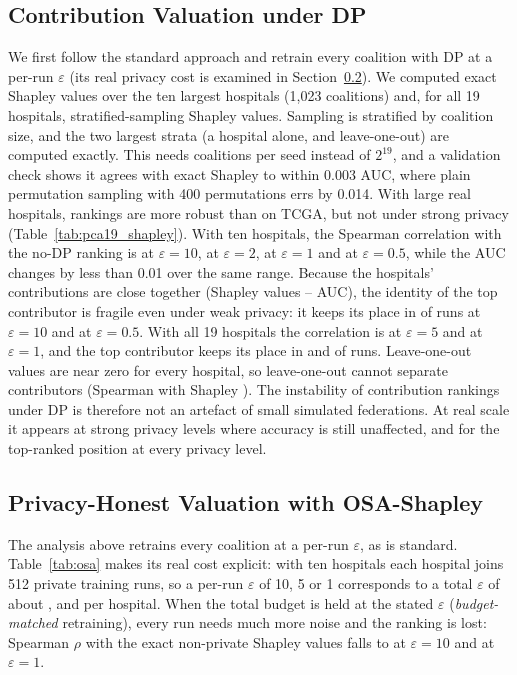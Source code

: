 \subsection{Contribution Valuation under DP}
We first follow the standard approach and retrain every coalition with DP at a per-run $\varepsilon$ (its real privacy cost is examined in Section~\ref{sec:p19_osa}). We computed exact Shapley values over the ten largest hospitals (1{,}023 coalitions) and, for all 19 hospitals, stratified-sampling Shapley values. Sampling is stratified by coalition size, and the two largest strata (a hospital alone, and leave-one-out) are computed exactly. This needs \pShNineCoal{} coalitions per seed instead of $2^{19}$, and a validation check shows it agrees with exact Shapley to within 0.003 AUC, where plain permutation sampling with 400 permutations errs by 0.014. With large real hospitals, rankings are more robust than on TCGA, but not under strong privacy (Table~\ref{tab:pca19_shapley}). With ten hospitals, the Spearman correlation with the no-DP ranking is \pShRhoTen{} at $\varepsilon=10$, \pShRhoTwo{} at $\varepsilon=2$, \pShRhoOne{} at $\varepsilon=1$ and \pShRhoHalf{} at $\varepsilon=0.5$, while the AUC changes by less than 0.01 over the same range. Because the hospitals' contributions are close together (Shapley values \pShPhiMin--\pShPhiMax{} AUC), the identity of the top contributor is fragile even under weak privacy: it keeps its place in \pShTSTen{} of runs at $\varepsilon=10$ and \pShTSHalf{} at $\varepsilon=0.5$. With all 19 hospitals the correlation is \pShNineRhoFive{} at $\varepsilon=5$ and \pShNineRhoOne{} at $\varepsilon=1$, and the top contributor keeps its place in \pShNineTSFive{} and \pShNineTSOne{} of runs. Leave-one-out values are near zero for every hospital, so leave-one-out cannot separate contributors (Spearman with Shapley \pShLooRho). The instability of contribution rankings under DP is therefore not an artefact of small simulated federations. At real scale it appears at strong privacy levels where accuracy is still unaffected, and for the top-ranked position at every privacy level.



\subsection{Privacy-Honest Valuation with OSA-Shapley}
\label{sec:p19_osa}
The analysis above retrains every coalition at a per-run $\varepsilon$, as is standard. Table~\ref{tab:osa} makes its real cost explicit: with ten hospitals each hospital joins 512 private training runs, so a per-run $\varepsilon$ of 10, 5 or 1 corresponds to a total $\varepsilon$ of about \trueEpsTen{}, \trueEpsFive{} and \trueEpsOne{} per hospital. When the total budget is held at the stated $\varepsilon$ (\emph{budget-matched} retraining), every run needs much more noise and the ranking is lost: Spearman $\rho$ with the exact non-private Shapley values falls to \bmRhoTen{} at $\varepsilon=10$ and \bmRhoOne{} at $\varepsilon=1$.

